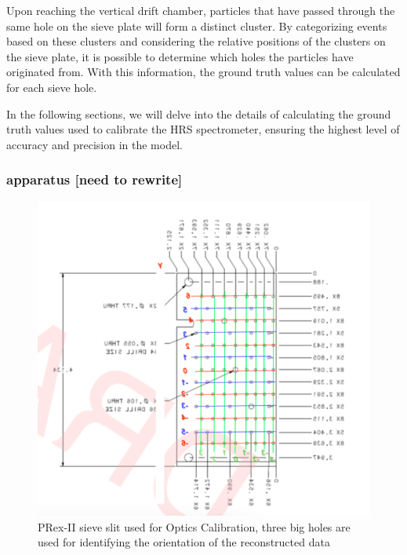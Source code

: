 Upon reaching the vertical drift chamber, particles that have passed through the same hole on the sieve plate will form a distinct cluster. By categorizing events based on these clusters and considering the relative positions of the clusters on the sieve plate, it is possible to determine which holes the particles have originated from. With this information, the ground truth values can be calculated for each sieve hole.

In the following sections, we will delve into the details of calculating the ground truth values used to calibrate the HRS spectrometer, ensuring the highest level of accuracy and precision in the model.

\subsubsection{apparatus [need to rewrite]}

\begin{figure}
    \centering
    \includegraphics[width =\textwidth]{images/chap4/sieve_cnc_draw.png}
    \caption{PRex-II sieve slit used for Optics Calibration, three big holes are used for identifying the orientation of the reconstructed data}
    \label{fig:sieve_cnc_draw}
\end{figure}


